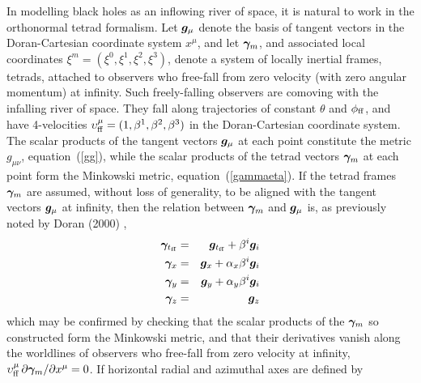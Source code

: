 \documentclass[twocolumn,showpacs,preprintnumbers,amsmath,amssymb,prb]{revtex4}
\begin{document}
In modelling black holes as an inflowing river of space,
it is natural to work in the orthonormal tetrad formalism.
Let $\bm{g}_\mu$ denote the basis of tangent vectors
in the Doran-Cartesian coordinate system $x^\mu$,
and let $\bm{\gamma}_m$,
and associated local coordinates $\xi^m = (\xi^0,\xi^1,\xi^2,\xi^3)$,
denote a system of locally inertial frames, tetrads,
attached to observers who free-fall from zero velocity
(with zero angular momentum) at infinity.
Such freely-falling observers
are comoving with the infalling river of space.
They fall along trajectories of constant $\theta$ and $\phi_{\rm ff}$,
and have 4-velocities
$\upsilon_{\rm ff}^\mu = (1, \beta^1, \beta^2, \beta^3)$
in the Doran-Cartesian coordinate system.
The scalar products of the tangent vectors $\bm{g}_\mu$ at each point
constitute the metric $g_{\mu\nu}$,
equation~(\ref{gg}),
while the scalar products of the tetrad vectors $\bm{\gamma}_m$ at each point
form the Minkowski metric,
equation~(\ref{gammaeta}).
If the tetrad frames $\bm{\gamma}_m$ are assumed, without loss of generality,
to be aligned with the tangent vectors $\bm{g}_\mu$ at infinity,
then the relation between $\bm{\gamma}_m$ and $\bm{g}_\mu$ is,
as previously noted by Doran (2000) \cite{Doran},
\begin{eqnarray}
\label{gammarot}
  \bm{\gamma}_{t_{\rm ff}}
  &=&
  \bm{g}_{t_{\rm ff}}
  + \beta^i \bm{g}_i
\nonumber
\\
  \bm{\gamma}_x
  &=&
  \bm{g}_x
  +
  \alpha_x \beta^i \bm{g}_i
\nonumber
\\
  \bm{\gamma}_y
  &=&
  \bm{g}_y
  +
  \alpha_y \beta^i \bm{g}_i
\\
  \bm{\gamma}_z
  &=&
  \bm{g}_z
\nonumber
\end{eqnarray}
which may be confirmed by checking that the scalar products of the $\bm{\gamma}_m$
so constructed form the Minkowski metric,
and that their derivatives vanish along the worldlines of observers
who free-fall from zero velocity at infinity,
$\upsilon_{\rm ff}^\mu \, \partial \bm{\gamma}_m / \partial x^\mu = 0$.
If horizontal radial and azimuthal axes are defined by
\end{document}
